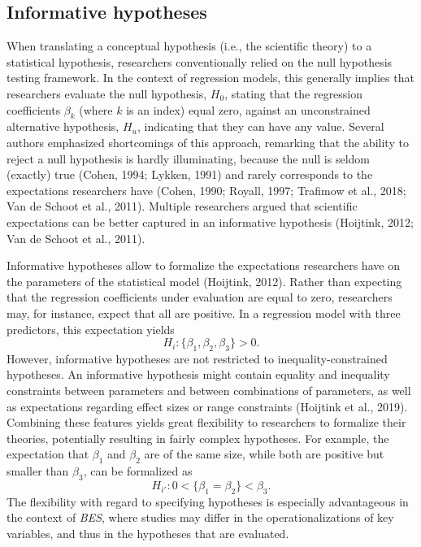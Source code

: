 \documentclass[
]{interact}
\begin{document}
\hypertarget{informative-hypotheses}{%
\subsection{Informative hypotheses}\label{informative-hypotheses}}

When translating a conceptual hypothesis (i.e., the scientific theory)
to a statistical hypothesis, researchers conventionally relied on the
null hypothesis testing framework. In the context of regression models,
this generally implies that researchers evaluate the null hypothesis,
\(H_0\), stating that the regression coefficients \(\beta_k\) (where
\(k\) is an index) equal zero, against an unconstrained alternative
hypothesis, \(H_u\), indicating that they can have any value. Several
authors emphasized shortcomings of this approach, remarking that the
ability to reject a null hypothesis is hardly illuminating, because the
null is seldom (exactly) true (Cohen, 1994; Lykken, 1991) and rarely
corresponds to the expectations researchers have (Cohen, 1990; Royall,
1997; Trafimow et al., 2018; Van de Schoot et al., 2011). Multiple
researchers argued that scientific expectations can be better captured
in an informative hypothesis (Hoijtink, 2012; Van de Schoot et al.,
2011).

Informative hypotheses allow to formalize the expectations researchers
have on the parameters of the statistical model (Hoijtink, 2012). Rather
than expecting that the regression coefficients under evaluation are
equal to zero, researchers may, for instance, expect that all are
positive. In a regression model with three predictors, this expectation
yields \[
H_i: \{\beta_1, \beta_2, \beta_3\} > 0.
\] However, informative hypotheses are not restricted to
inequality-constrained hypotheses. An informative hypothesis might
contain equality and inequality constraints between parameters and
between combinations of parameters, as well as expectations regarding
effect sizes or range constraints (Hoijtink et al., 2019). Combining
these features yields great flexibility to researchers to formalize
their theories, potentially resulting in fairly complex hypotheses. For
example, the expectation that \(\beta_1\) and \(\beta_2\) are of the
same size, while both are positive but smaller than \(\beta_3\), can be
formalized as \[
H_{i'}: 0 < \{\beta_1=\beta_2\} < \beta_3. 
    \] The flexibility with regard to specifying hypotheses is especially
advantageous in the context of \emph{BES}, where studies may differ in
the operationalizations of key variables, and thus in the hypotheses
that are evaluated.
\end{document}
